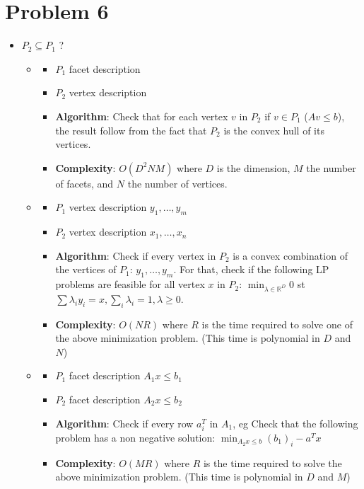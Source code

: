 \documentclass[11pt]{article}
\begin{document}
\section{Problem 6}
\label{sec:orgheadline6}
\begin{itemize}
\item \(P_2 \subseteq P_1\) ?
\begin{itemize}
\item \begin{itemize}
\item \(P_1\) facet description
\item \(P_2\) vertex description
\item \textbf{Algorithm}: Check that for each vertex \(v\) in \(P_2\) if \(v \in P_1\) (\(Av \le b\)), the result follow from the fact that \(P_2\) is the convex hull of its vertices.

\item \textbf{Complexity}: \(O(D^2NM)\) where \(D\) is the dimension, \(M\) the number of facets, and \(N\) the number of vertices.
\end{itemize}

\item \begin{itemize}
\item \(P_1\) vertex description \(y_1, \ldots, y_m\)
\item \(P_2\) vertex description \(x_1, \ldots, x_n\)
\item \textbf{Algorithm}: Check if every vertex in \(P_2\) is a convex combination of the vertices of \(P_1\): \(y_1, \ldots, y_m\). For that, check if the following LP problems are feasible for all vertex \(x\) in \(P_2\):  \(\min_{\lambda \in \mathbb{R}^D} 0\) st \(\sum \lambda_i y_i = x, \sum_i \lambda_i = 1, \lambda \ge 0\).
\item \textbf{Complexity}: \(O(N R)\) where \(R\) is the time required to solve one of the above minimization problem. (This time is polynomial in \(D\) and \(N\))
\end{itemize}

\item \begin{itemize}
\item \(P_1\) facet description \(A_1x \le b_1\)
\item \(P_2\) facet description \(A_2x \le b_2\)
\item \textbf{Algorithm}: Check if every row  \(a_i^T\) in \(A_1\), eg Check that the following problem has a non negative solution:
\(\min_{A_2x \le b} (b_1)_i - a^T x\)
\item \textbf{Complexity}: \(O(M R)\) where \(R\) is the time required to solve the above minimization problem. (This time is polynomial in \(D\) and \(M\))
\end{itemize}
\end{itemize}
\end{itemize}
\end{document}
